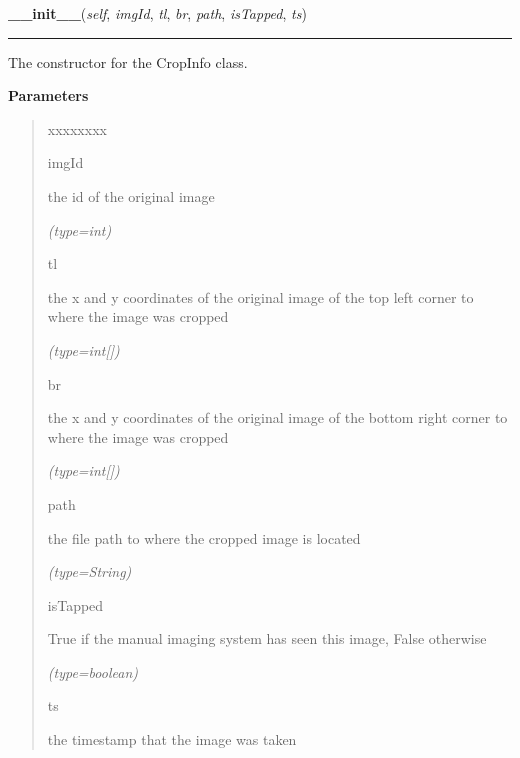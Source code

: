 \hspace{.8\funcindent}\begin{boxedminipage}{\funcwidth}

    \raggedright \textbf{\_\_init\_\_}(\textit{self}, \textit{imgId}, \textit{tl}, \textit{br}, \textit{path}, \textit{isTapped}, \textit{ts})

    \vspace{-1.5ex}

    \rule{\textwidth}{0.5\fboxrule}
\setlength{\parskip}{2ex}
    The constructor for the CropInfo class.

\setlength{\parskip}{1ex}
      \textbf{Parameters}
      \vspace{-1ex}

      \begin{quote}
        \begin{Ventry}{xxxxxxxx}

          \item[imgId]

          the id of the original image

            {\it (type=int)}

          \item[tl]

          the x and y coordinates of the original image of the top left 
          corner to where the image was cropped

            {\it (type=int[])}

          \item[br]

          the x and y coordinates of the original image of the bottom right
          corner to where the image was cropped

            {\it (type=int[])}

          \item[path]

          the file path to where the cropped image is located

            {\it (type=String)}

          \item[isTapped]

          True if the manual imaging system has seen this image, False 
          otherwise

            {\it (type=boolean)}

          \item[ts]

          the timestamp that the image was taken


\end{Ventry}
\end{quote}
\end{boxedminipage}
